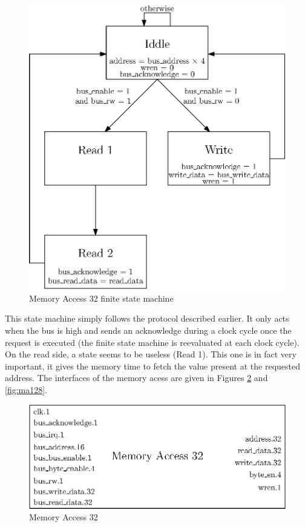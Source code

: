 \begin{figure}[H]
    \center
    \includegraphics[scale=0.8]{"Chapter6-MAU_CTRLU/res/mau_fsm"}
    \caption{Memory Access 32 finite state machine}
    \label{fig:ma_fsm}
\end{figure}

This state machine simply follows the protocol described earlier. It only acts when the bus is high 
and sends an acknowledge during a clock cycle once the request is executed (the finite state machine 
is reevaluated at each clock cycle). On the read side, a state seems to be useless (Read 1). This 
one is in fact very important, it gives the memory time to fetch the value present at the requested 
address. The interfaces of the memory acess are given in Figures \ref{fig:ma32} and \ref{fig:ma128}.

\begin{figure}[H]
    \center
    \includegraphics[scale=0.8]{"Chapter6-MAU_CTRLU/res/memory_access_32"}
    \caption{Memory Access 32}
    \label{fig:ma32}
\end{figure}

